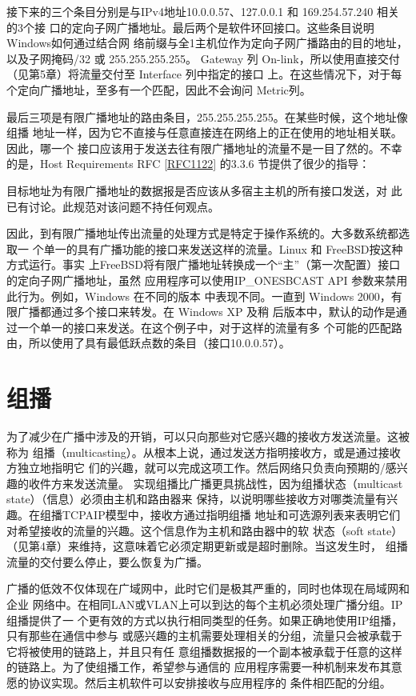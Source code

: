 接下来的三个条目分别是与IPv4地址10.0.0.57、127.0.0.1 和 169.254.57.240 相关的3个接
口的定向子网广播地址。最后两个是软件环回接口。这些条目说明Windows如何通过结合网
络前缀与全1主机位作为定向子网广播路由的目的地址，以及子网掩码/32 或 255.255.255.255。
Gateway 列 On-link，所以使用直接交付（见第5章）将流量交付至 Interface 列中指定的接口
上。在这些情况下，对于每个定向广播地址，至多有一个匹配，因此不会询问 Metric列。

最后三项是有限广播地址的路由条目，255.255.255.255。在某些时候，这个地址像组播
地址一样，因为它不直接与任意直接连在网络上的正在使用的地址相关联。因此，哪一个
接口应该用于发送去往有限广播地址的流量不是一目了然的。不幸的是，Host Requirements
RFC \href{https://www.rfc-editor.org/rfc/rfc1122}{[RFC1122]} 的3.3.6 节提供了很少的指导：

\begin{tcolorbox}
    目标地址为有限广播地址的数据报是否应该从多宿主主机的所有接口发送，对
    此已有讨论。此规范对该问题不持任何观点。
\end{tcolorbox}

因此，到有限广播地址传出流量的处理方式是特定于操作系统的。大多数系统都选取一
个单一的具有广播功能的接口来发送这样的流量。Linux 和 FreeBSD按这种方式运行。事实
上FreeBSD将有限广播地址转换成一个“主”（第一次配置）接口的定向子网广播地址，虽然
应用程序可以使用IP\_ONESBCAST API 参数来禁用此行为。例如，Windows 在不同的版本
中表现不同。一直到 Windows 2000，有限广播都通过多个接口来转发。在 Windows XP 及稍
后版本中，默认的动作是通过一个单一的接口来发送。在这个例子中，对于这样的流量有多
个可能的匹配路由，所以使用了具有最低跃点数的条目（接口10.0.0.57）。

\section{组播}
为了减少在广播中涉及的开销，可以只向那些对它感兴趣的接收方发送流量。这被称为
组播（multicasting）。从根本上说，通过发送方指明接收方，或是通过接收方独立地指明它
们的兴趣，就可以完成这项工作。然后网络只负责向预期的/感兴趣的收件方来发送流量。
实现组播比广播更具挑战性，因为组播状态（multicast state）（信息）必须由主机和路由器来
保持，以说明哪些接收方对哪类流量有兴趣。在组播TCPAIP模型中，接收方通过指明组播
地址和可选源列表来表明它们对希望接收的流量的兴趣。这个信息作为主机和路由器中的软
状态（soft state）（见第4章）来维持，这意味着它必须定期更新或是超时删除。当这发生时，
组播流量的交付要么停止，要么恢复为广播。

广播的低效不仅体现在广域网中，此时它们是极其严重的，同时也体现在局域网和企业
网络中。在相同LAN或VLAN上可以到达的每个主机必须处理广播分组。IP 组播提供了一
个更有效的方式以执行相同类型的任务。如果正确地使用IP组播，只有那些在通信中参与
或感兴趣的主机需要处理相关的分组，流量只会被承载于它将被使用的链路上，并且只有任
意组播数据报的一个副本被承载于任意的这样的链路上。为了使组播工作，希望参与通信的
应用程序需要一种机制来发布其意愿的协议实现。然后主机软件可以安排接收与应用程序的
条件相匹配的分组。

